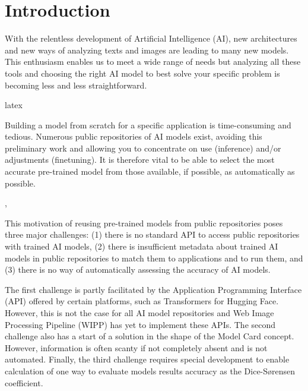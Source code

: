 \section{Introduction}
\label{sec:intro}

With the relentless development of Artificial Intelligence (AI), new
architectures and new ways of analyzing texts and images are leading to many new
models. This enthusiasm enables us to meet a wide range of needs but analyzing
all these tools and choosing the right AI model to best solve your specific
problem is becoming less and less straightforward.

\Gls{latex}

Building a model from scratch for a specific application is time-consuming and
tedious. Numerous public repositories of AI models exist, avoiding this
preliminary work and allowing you to concentrate on use (inference) and/or
adjustments (finetuning). It is therefore vital to be able to select the most
accurate pre-trained model from those available, if possible, as automatically
as possible.

\cite{Authors14}, \cite{Authors14b}


This motivation of reusing pre-trained models from public repositories poses
three major challenges: (1) there is no standard API to access public
repositories with trained AI models, (2) there is insufficient metadata about
trained AI models in public repositories to match them to applications and to
run them, and (3) there is no way of automatically assessing the accuracy of AI
models.

The first challenge is partly facilitated by the Application Programming
Interface (API) offered by certain platforms, such as Transformers for Hugging
Face. However, this is not the case for all AI model repositories and Web Image
Processing Pipeline (WIPP) has yet to implement these APIs. The second challenge
also has a start of a solution in the shape of the Model Card concept. However,
information is often scanty if not completely absent and is not automated.
Finally, the third challenge requires special development to enable calculation
of one way to evaluate models results accuracy as the Dice-Sørensen coefficient.
